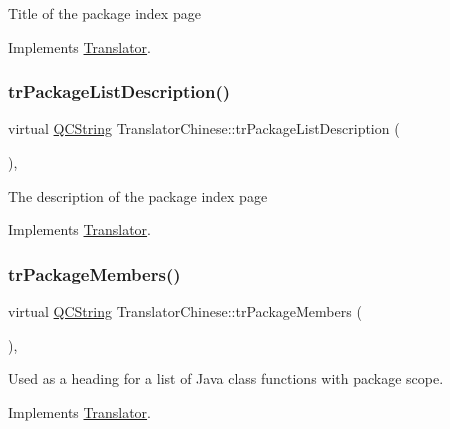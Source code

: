 Title of the package index page 

Implements \mbox{\hyperlink{class_translator}{Translator}}.

\mbox{\label{class_translator_chinese_ab80bf19ed8915624a5ad251f5c8d217e}} 
\subsubsection{\texorpdfstring{trPackageListDescription()}{trPackageListDescription()}}
{\footnotesize\ttfamily virtual \mbox{\hyperlink{class_q_c_string}{Q\+C\+String}} Translator\+Chinese\+::tr\+Package\+List\+Description (\begin{DoxyParamCaption}{ }\end{DoxyParamCaption})\hspace{0.3cm}{\ttfamily [inline]}, {\ttfamily [virtual]}}

The description of the package index page 

Implements \mbox{\hyperlink{class_translator}{Translator}}.

\mbox{\label{class_translator_chinese_ae085517b705f2b4a3f41259dc5fedcb1}} 
\subsubsection{\texorpdfstring{trPackageMembers()}{trPackageMembers()}}
{\footnotesize\ttfamily virtual \mbox{\hyperlink{class_q_c_string}{Q\+C\+String}} Translator\+Chinese\+::tr\+Package\+Members (\begin{DoxyParamCaption}{ }\end{DoxyParamCaption})\hspace{0.3cm}{\ttfamily [inline]}, {\ttfamily [virtual]}}

Used as a heading for a list of Java class functions with package scope. 

Implements \mbox{\hyperlink{class_translator}{Translator}}.

\mbox{\label{class_translator_chinese_a46fb6bff7f64ae756eabaac2bc387d0a}} 
